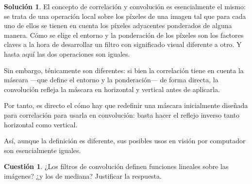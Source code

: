 \documentclass[a4paper, 11pt]{article}
\theoremstyle{definition}
\newtheorem*{solucion}{Solución}
\theoremstyle{theorem}
\newtheorem{cuestion}{Cuestión}
\begin{document}
  \begin{solucion}
      El concepto de correlación y convolución es esencialmente el mismo: se trata de una operación local sobre los píxeles de una imagen tal que para cada uno de ellos se tienen en cuenta los píxeles adyacentes ponderados de alguna manera. Cómo se elige el entorno y la ponderación de los píxeles son los factores claves a la hora de desarrollar un filtro con significado visual diferente a otro. Y hasta aquí las dos operaciones son iguales.

      Sin embargo, ténicamente son diferentes: si bien la correlación tiene en cuenta la máscara ---que define el entorno y la ponderación--- de forma directa, la convolución refleja la máscara en horizontal y vertical antes de aplicarla.

      Por tanto, es directo el cómo hay que redefinir una máscara inicialmente diseñada para correlación para usarla en convolución: basta hacer el reflejo inverso tanto horizontal como vertical.

      Así, aunque la definición es diferente, sus posibles usos en visión por computador son esencialmente iguales.
  \end{solucion}

  \begin{cuestion}
      ¿Los filtros de convolución definen funciones lineales sobre las imágenes? ¿y los de mediana? Justificar la respuesta.
  \end{cuestion}
\end{document}
